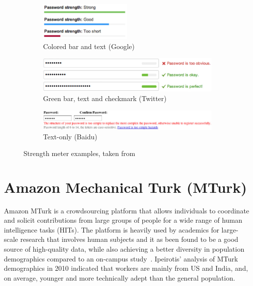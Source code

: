     \begin{figure}[H]
        \begin{subfigure}[t]{\textwidth}
            \includegraphics[width=0.5\textwidth]{Images/str-meter-google}
            \caption{Colored bar and text (Google)}
        \end{subfigure}

        \begin{subfigure}[t]{\textwidth}
            \includegraphics[width=\textwidth]{Images/str-meter-twitter}
            \caption{Green bar, text and checkmark (Twitter)}
        \end{subfigure}

        \begin{subfigure}[t]{\textwidth}
            \includegraphics[width=\textwidth]{Images/str-meter-baidu}
            \caption{Text-only (Baidu)}
        \end{subfigure}

      \caption{Strength meter examples, taken from \cite{strength_meter_effect}}
      \label{fig:str_meter_examples}
    \end{figure}

  \section{Amazon Mechanical Turk (MTurk)}
    \label{sec:mturk}
    Amazon MTurk is a crowdsourcing platform that allows individuals to coordinate and solicit contributions from large groups of people for a wide range of human intelligence tasks (HITs). The platform is heavily used by academics for large-scale research that involves human subjects and it as been found to be a good source of high-quality data, while also achieving a better diversity in population demographics compared to an on-campus study~\cite{turk1,turk2}. Ipeirotis' analysis of MTurk demographics in 2010 indicated that workers are mainly from US and India, and, on average, younger and more technically adept than the general population\cite{mturk_demographic}.